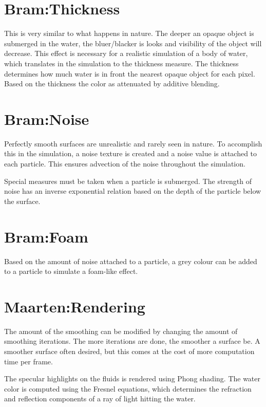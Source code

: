 \documentclass{article}
\begin{document}
\section{Bram:Thickness} %
\label{sec:_thickness}
This is very similar to what happens in nature. 
The deeper an opaque object is submerged in the water, the bluer/blacker is looks and visibility of the object will decrease.
This effect is necessary for a realistic simulation of a body of water, which translates in the simulation to the thickness measure.
The thickness determines how much water is in front the nearest opaque object for each pixel. Based on the thickness the color as attenuated by additive blending.

\section{Bram:Noise} %
\label{sec:noise}
Perfectly smooth surfaces are unrealistic and rarely seen in nature. To accomplish this in the simulation, a noise texture is created and a noise value is attached to each particle. This ensures advection of the noise throughout the simulation.

Special measures must be taken when a particle is submerged. The strength of noise has an inverse exponential relation based on the depth of the particle below the surface.

\section{Bram:Foam} %
\label{sec:foam}
Based on the amount of noise attached to a particle, a grey colour can be added to a particle to simulate a foam-like effect.

\section{Maarten:Rendering} %
\label{sec:rendering}
The amount of the smoothing can be modified by changing the amount of smoothing iterations.
The more iterations are done, the smoother a surface be. A smoother surface often desired, but this comes at the cost of more computation time per frame.

The specular highlights on the fluids is rendered using Phong shading. 
The water color is computed using the Fresnel equations, which determines the refraction and reflection components of a ray of light hitting the water.
\end{document}
